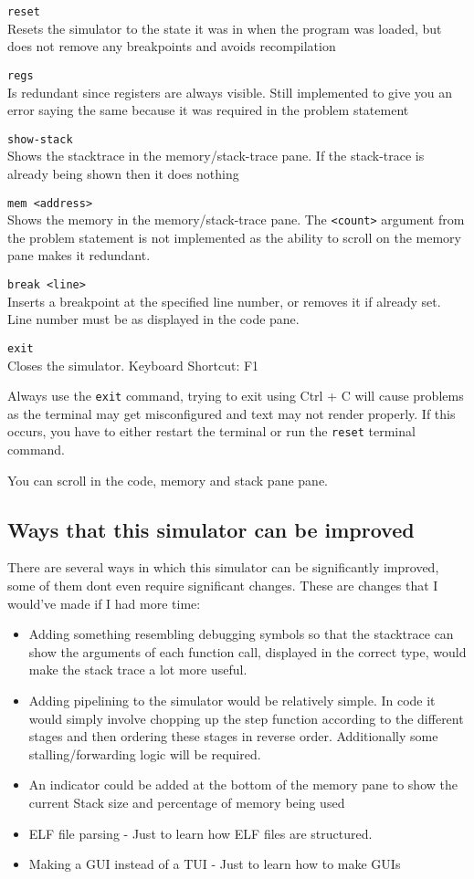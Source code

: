\documentclass[12pt]{article}
\begin{document}
	\verb|reset|\\
	Resets the simulator to the state it was in when the program was loaded, but does not remove any breakpoints and avoids recompilation

	\verb|regs|\\
	Is redundant since registers are always visible. Still implemented to give you an error saying the same because it was required in the problem statement

	\verb|show-stack|\\
	Shows the stacktrace in the memory/stack-trace pane. If the stack-trace is already being shown then it does nothing

	\verb|mem <address>|\\
	Shows the memory in the memory/stack-trace pane. The \verb|<count>| argument from the problem statement is not implemented as the ability to scroll on the memory pane makes it redundant.

	\verb|break <line>|\\
	Inserts a breakpoint at the specified line number, or removes it if already set. Line number must be as displayed in the code pane.

	\verb|exit|\\
	Closes the simulator. Keyboard Shortcut: F1
	
	Always use the \verb|exit| command, trying to exit using Ctrl + C will cause problems as the terminal may get misconfigured and text may not render properly. If this occurs, you have to either restart the terminal or run the \verb|reset| terminal command.

	You can scroll in the code, memory and stack pane pane.

	\subsection{Ways that this simulator can be improved}

	There are several ways in which this simulator can be significantly improved, some of them dont even require significant changes. These are changes that I would've made if I had more time:

	\begin{itemize}
		\item Adding something resembling debugging symbols so that the stacktrace can show the arguments of each function call, displayed in the correct type, would make the stack trace a lot more useful.
		\item Adding pipelining to the simulator would be relatively simple. In code it would simply involve chopping up the step function according to the different stages and then ordering these stages in reverse order. Additionally some stalling/forwarding logic will be required.
		\item An indicator could be added at the bottom of the memory pane to show the current Stack size and percentage of memory being used
		\item ELF file parsing - Just to learn how ELF files are structured.
		\item Making a GUI instead of a TUI - Just to learn how to make GUIs
	\end{itemize}
\end{document}
